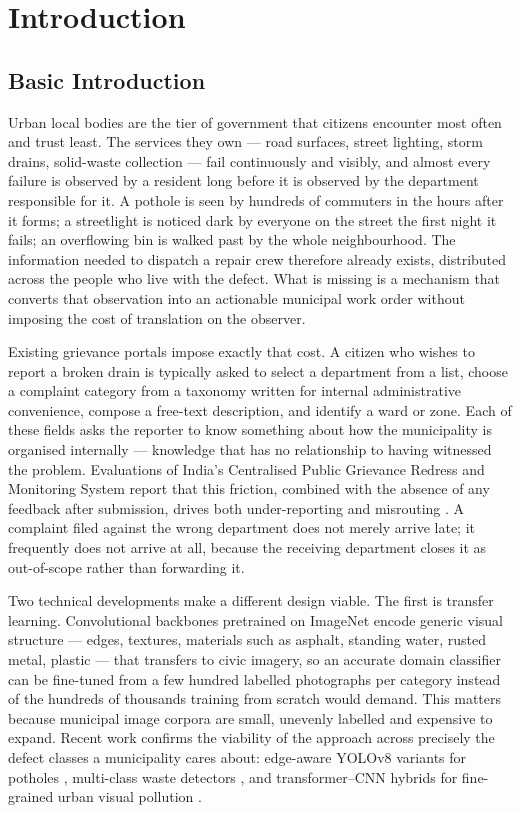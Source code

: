 \documentclass[conference]{IEEEtran}
\begin{document}
\section{Introduction}
\label{sec:intro}

\subsection{Basic Introduction}
Urban local bodies are the tier of government that citizens encounter most often and trust least. The services they own --- road surfaces, street lighting, storm drains, solid-waste collection --- fail continuously and visibly, and almost every failure is observed by a resident long before it is observed by the department responsible for it. A pothole is seen by hundreds of commuters in the hours after it forms; a streetlight is noticed dark by everyone on the street the first night it fails; an overflowing bin is walked past by the whole neighbourhood. The information needed to dispatch a repair crew therefore already exists, distributed across the people who live with the defect. What is missing is a mechanism that converts that observation into an actionable municipal work order without imposing the cost of translation on the observer.

Existing grievance portals impose exactly that cost. A citizen who wishes to report a broken drain is typically asked to select a department from a list, choose a complaint category from a taxonomy written for internal administrative convenience, compose a free-text description, and identify a ward or zone. Each of these fields asks the reporter to know something about how the municipality is organised internally --- knowledge that has no relationship to having witnessed the problem. Evaluations of India's Centralised Public Grievance Redress and Monitoring System report that this friction, combined with the absence of any feedback after submission, drives both under-reporting and misrouting \cite{rao2019cpgrams}. A complaint filed against the wrong department does not merely arrive late; it frequently does not arrive at all, because the receiving department closes it as out-of-scope rather than forwarding it.

Two technical developments make a different design viable. The first is transfer learning. Convolutional backbones pretrained on ImageNet \cite{deng2009imagenet, he2016resnet} encode generic visual structure --- edges, textures, materials such as asphalt, standing water, rusted metal, plastic --- that transfers to civic imagery, so an accurate domain classifier can be fine-tuned from a few hundred labelled photographs per category instead of the hundreds of thousands training from scratch would demand. This matters because municipal image corpora are small, unevenly labelled and expensive to expand. Recent work confirms the viability of the approach across precisely the defect classes a municipality cares about: edge-aware YOLOv8 variants for potholes \cite{l1potyolo, l3roadperception}, multi-class waste detectors \cite{l5multiclasswaste, l6householdgarbage}, and transformer--CNN hybrids for fine-grained urban visual pollution \cite{l8visualpollution}.
\end{document}
